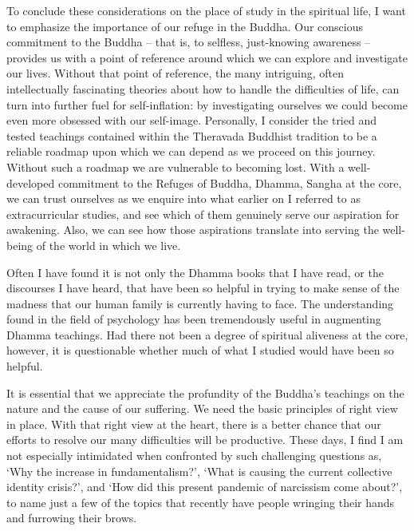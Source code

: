 \sectionBreak

To conclude these considerations on the place of study in the spiritual
life, I want to emphasize the importance of our refuge in the Buddha.
Our conscious commitment to the Buddha -- that is, to selfless,
just-knowing awareness -- provides us with a point of reference around
which we can explore and investigate our lives. Without that point of
reference, the many intriguing, often intellectually fascinating
theories about how to handle the difficulties of life, can turn into
further fuel for self-inflation: by investigating ourselves we could
become even more obsessed with our self-image. Personally, I consider
the tried and tested teachings contained within the Theravada Buddhist
tradition to be a reliable roadmap upon which we can depend as we
proceed on this journey. Without such a roadmap we are vulnerable to
becoming lost. With a well-developed commitment to the Refuges of
Buddha, Dhamma, Sangha at the core, we can trust ourselves as we enquire
into what earlier on I referred to as extracurricular studies, and see
which of them genuinely serve our aspiration for awakening. Also, we can
see how those aspirations translate into serving the well-being of the
world in which we live.

Often I have found it is not only the Dhamma books that I have read, or
the discourses I have heard, that have been so helpful in trying to make
sense of the madness that our human family is currently having to face.
The understanding found in the field of psychology has been 
tremendously useful in augmenting Dhamma teachings. Had there not been a degree of
spiritual aliveness at the core, however, it is questionable whether
much of what I studied would have been so helpful.

It is essential that we appreciate the profundity of the Buddha's
teachings on the nature and the cause of our suffering. We need the
basic principles of right view in place. With that right view at the
heart, there is a better chance that our efforts to resolve our many
difficulties will be productive. These days, I find I am not especially
intimidated when confronted by such challenging questions as, `Why the
increase in fundamentalism?', `What is causing the current collective
identity crisis?', and `How did this present pandemic of narcissism come
about?', to name just a few of the topics that recently have people
wringing their hands and furrowing their brows.

